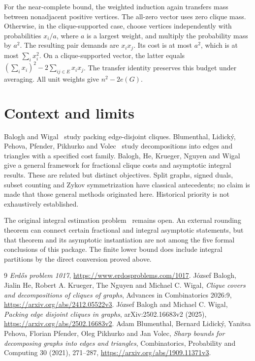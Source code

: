 \documentclass[11pt]{article}
\begin{document}
For the near-complete bound, the weighted induction again transfers mass between nonadjacent positive vertices. The all-zero vector uses zero clique mass. Otherwise, in the clique-supported case, choose vertices independently with probabilities $x_i/a$, where $a$ is a largest weight, and multiply the probability mass by $a^2$. The resulting pair demands are $x_ix_j$. Its cost is at most $a^2$, which is at most $\sum_i x_i^2$. On a clique-supported vector, the latter equals $(\sum_i x_i)^2-2\sum_{ij\in E}x_ix_j$. The transfer identity preserves this budget under averaging. All unit weights give $n^2-2e(G)$.

\section{Context and limits}
Balogh and Wigal~\cite{bw} study packing edge-disjoint cliques. Blumenthal, Lidick\'y, Pehova, Pfender, Pikhurko and Volec~\cite{bl} study decompositions into edges and triangles with a specified cost family. Balogh, He, Krueger, Nguyen and Wigal~\cite{bhknw} give a general framework for fractional clique costs and asymptotic integral results. These are related but distinct objectives. Split graphs, signed duals, subset counting and Zykov symmetrization have classical antecedents; no claim is made that those general methods originated here. Historical priority is not exhaustively established.

The original integral estimation problem~\cite{ep} remains open. An external rounding theorem can connect certain fractional and integral asymptotic statements, but that theorem and its asymptotic instantiation are not among the five formal conclusions of this package. The finite lower bound does include integral partitions by the direct conversion proved above.

\begin{thebibliography}{9}
 \emph{Erd\H{o}s problem 1017}, \url{https://www.erdosproblems.com/1017}.
 J\'ozsef Balogh, Jialin He, Robert A. Krueger, The Nguyen and Michael C. Wigal, \emph{Clique covers and decompositions of cliques of graphs}, Advances in Combinatorics 2026:9, \url{https://arxiv.org/abs/2412.05522v3}.
 J\'ozsef Balogh and Michael C. Wigal, \emph{Packing edge disjoint cliques in graphs}, arXiv:2502.16683v2 (2025), \url{https://arxiv.org/abs/2502.16683v2}.
 Adam Blumenthal, Bernard Lidick\'y, Yanitsa Pehova, Florian Pfender, Oleg Pikhurko and Jan Volec, \emph{Sharp bounds for decomposing graphs into edges and triangles}, Combinatorics, Probability and Computing 30 (2021), 271--287, \url{https://arxiv.org/abs/1909.11371v3}.
\end{thebibliography}
\end{document}
